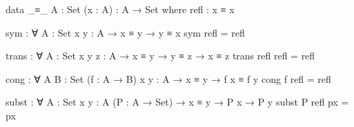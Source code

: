 \documentclass{article}
\begin{document}
\begin{code}
data _≡_ {A : Set} (x : A) : A → Set where
  refl : x ≡ x

sym : ∀ {A : Set} {x y : A} → x ≡ y → y ≡ x
sym refl = refl

trans : ∀ {A : Set} {x y z : A} → x ≡ y → y ≡ z → x ≡ z
trans refl refl = refl

cong : ∀ {A B : Set} (f : A → B) {x y : A} → x ≡ y → f x ≡ f y
cong f refl = refl

subst : ∀ {A : Set} {x y : A} (P : A → Set) → x ≡ y → P x → P y
subst P refl px = px
\end{code}
\end{document}
